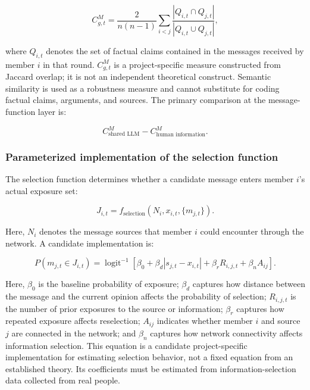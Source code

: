 \documentclass[11pt,a4paper]{article}
\begin{document}
\begin{equation*}
C^{M}_{g,t}
=
\frac{2}{n(n-1)}
\sum_{i<j}
\frac{|Q_{i,t}\cap Q_{j,t}|}
{|Q_{i,t}\cup Q_{j,t}|},
\end{equation*}

where $Q_{i,t}$ denotes the set of factual claims contained in the messages received by member $i$ in that round. $C^{M}_{g,t}$ is a project-specific measure constructed from Jaccard overlap; it is not an independent theoretical construct. Semantic similarity is used as a robustness measure and cannot substitute for coding factual claims, arguments, and sources. The primary comparison at the message-function layer is:

\begin{equation*}
C^{M}_{\text{shared LLM}}
-
C^{M}_{\text{human information}}.
\end{equation*}

\subsubsection{Parameterized implementation of the selection function}

The selection function determines whether a candidate message enters member $i$'s actual exposure set:

\begin{equation*}
J_{i,t}
=
f_{\text{selection}}
(N_i,x_{i,t},\{m_{j,t}\}).
\end{equation*}

Here, $N_i$ denotes the message sources that member $i$ could encounter through the network. A candidate implementation is:

\begin{equation*}
P(m_{j,t}\in J_{i,t})
=
\operatorname{logit}^{-1}
\left[
\beta_0
+
\beta_d|s_{j,t}-x_{i,t}|
+
\beta_rR_{i,j,t}
+
\beta_nA_{ij}
\right].
\end{equation*}

Here, $\beta_0$ is the baseline probability of exposure; $\beta_d$ captures how distance between the message and the current opinion affects the probability of selection; $R_{i,j,t}$ is the number of prior exposures to the source or information; $\beta_r$ captures how repeated exposure affects reselection; $A_{ij}$ indicates whether member $i$ and source $j$ are connected in the network; and $\beta_n$ captures how network connectivity affects information selection. This equation is a candidate project-specific implementation for estimating selection behavior, not a fixed equation from an established theory. Its coefficients must be estimated from information-selection data collected from real people.
\end{document}
